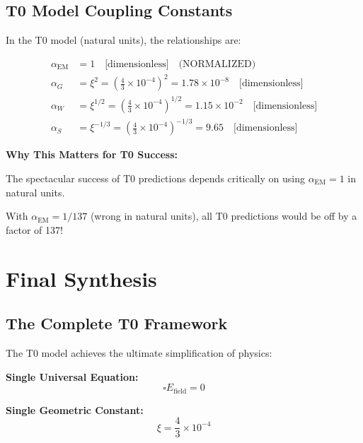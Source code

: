 \documentclass[12pt,a4paper]{report}
\begin{document}
\subsection{T0 Model Coupling Constants}
\label{subsec:t0_coupling_corrected}

In the T0 model (natural units), the relationships are:

\begin{align}
	\alpha_{\text{EM}} &= 1 \quad \text{[dimensionless]} \quad \text{(NORMALIZED)} \\
	\alpha_G &= \xi^2 = \left(\frac{4}{3} \times 10^{-4}\right)^2 = 1.78 \times 10^{-8} \quad \text{[dimensionless]} \\
	\alpha_W &= \xi^{1/2} = \left(\frac{4}{3} \times 10^{-4}\right)^{1/2} = 1.15 \times 10^{-2} \quad \text{[dimensionless]} \\
	\alpha_S &= \xi^{-1/3} = \left(\frac{4}{3} \times 10^{-4}\right)^{-1/3} = 9.65 \quad \text{[dimensionless]}
\end{align}

\textbf{Why This Matters for T0 Success:}

\begin{tcolorbox}[colback=green!10!white,colframe=green!75!black,title=T0 SUCCESS EXPLAINED]
	The spectacular success of T0 predictions depends critically on using $\alpha_{\text{EM}} = 1$ in natural units.
	
	With $\alpha_{\text{EM}} = 1/137$ (wrong in natural units), all T0 predictions would be off by a factor of 137!
\end{tcolorbox}

\section{Final Synthesis}
\label{sec:final_synthesis}

\subsection{The Complete T0 Framework}
\label{subsec:complete_framework}

The T0 model achieves the ultimate simplification of physics:

\textbf{Single Universal Equation:}
\begin{equation}
	\square E_{\text{field}} = 0
\end{equation}

\textbf{Single Geometric Constant:}
\begin{equation}
	\xi = \frac{4}{3} \times 10^{-4}
\end{equation}
\end{document}
